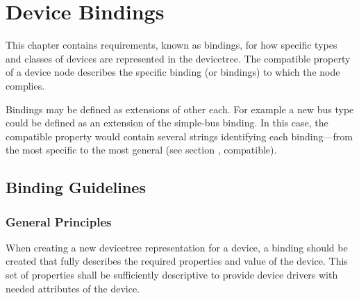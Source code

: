 \documentclass[a4paper,10pt,oneside]{sphinxmanual}
\begin{document}
\chapter{Device Bindings}
\label{device-bindings::doc}\label{device-bindings:device-bindings}\label{device-bindings:chapter-device-bindings}
This chapter contains requirements, known as bindings, for how specific
types and classes of devices are represented in the devicetree. The
compatible property of a device node describes the specific binding (or
bindings) to which the node complies.

Bindings may be defined as extensions of other each. For example a new
bus type could be defined as an extension of the simple-bus binding. In
this case, the compatible property would contain several strings
identifying each binding—from the most specific to the most general (see
section {\hyperref[devicetree\string-basics:sect\string-standard\string-properties\string-compatible]{}}, compatible).


\section{Binding Guidelines}
\label{device-bindings:binding-guidelines}

\subsection{General Principles}
\label{device-bindings:general-principles}
When creating a new devicetree representation for a device, a binding
should be created that fully describes the required properties and value
of the device. This set of properties shall be sufficiently descriptive
to provide device drivers with needed attributes of the device.
\end{document}
